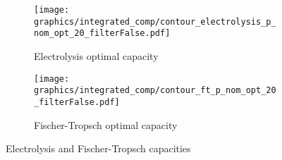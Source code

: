 \begin{figure*}[h] %
    \centering
    \begin{subfigure}[b]{0.45\linewidth}
        \centering
        \texttt{[image: graphics/integrated\_comp/contour\_electrolysis\_p\_nom\_opt\_20\_filterFalse.pdf]}
        \caption{Electrolysis optimal capacity}
        \label{fig:ely-p-nom-opt}
    \end{subfigure}
    \hfill
    \begin{subfigure}[b]{0.45\linewidth}
        \centering
        \texttt{[image: graphics/integrated\_comp/contour\_ft\_p\_nom\_opt\_20\_filterFalse.pdf]}
        \caption{Fischer-Tropsch optimal capacity}
        \label{fig:ft-p-nom-opt}
    \end{subfigure}

    \hfill

    \caption{Electrolysis and Fischer-Tropsch capacities}
    \label{fig:ely-ft-p-nom-opt}
\end{figure*}

\clearpage